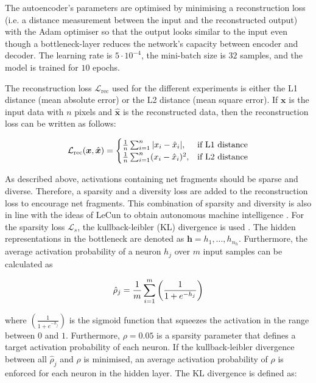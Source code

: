 The autoencoder's parameters are optimised by minimising a reconstruction loss (i.e. a distance measurement between the input and the reconstructed output) with the Adam optimiser  so that the output looks similar to the input even though a bottleneck-layer reduces the network's capacity between encoder and decoder.
The learning rate is $5 \cdot 10^{-4}$, the mini-batch size is $32$ samples, and the model is trained for $10$ epochs.

The reconstruction loss $\mathcal{L}_{\text{rec}}$ used for the different experiments is either the L1 distance (mean absolute error) or the L2 distance (mean square error). If $\boldsymbol{x}$ is the input data with $n$ pixels and $\hat{\boldsymbol{x}}$ is the reconstructed data, then the reconstruction loss can be written as follows:


\begin{align}\eqlbl{ae_recon}
		\mathcal{L}_{\text{rec}}(\boldsymbol{x}, \hat{\boldsymbol{x}}) = \begin{cases}
      		\frac{1}{n} \sum^{n}_{i=1}|x_i - \hat{x}_i|, & \text{if L1 distance}\\
      		\frac{1}{n} \sum^{n}_{i=1} (x_i - \hat{x}_i)^2, & \text{if L2 distance}
    	\end{cases}
\end{align}

As described above, activations containing net fragments should be sparse and diverse.
Therefore, a sparsity and a diversity loss are added to the reconstruction loss to encourage net fragments.
This combination of sparsity and diversity is also in line with the ideas of LeCun to obtain autonomous machine intelligence .
For the sparsity loss $\mathcal{L}_{s}$, the kullback-leibler (KL) divergence is used .
The hidden representations in the bottleneck are denoted as $\boldsymbol{h} = h_1, ..., h_{n_h}$.
Furthermore, the average activation probability of a neuron $h_j$ over $m$ input samples can be calculated as

\begin{align}\eqlbl{ae_kldd}
		\hat{\rho}_j = \frac{1}{m} \sum^m_{i=1} \left( \frac{1}{1+e^{-h_j}} \right)
\end{align}

where $\left( \frac{1}{1+e^{-h_j}} \right)$ is the sigmoid function that squeezes the activation in the range between $0$ and $1$. Furthermore, $\rho=0.05$ is a sparsity parameter that defines a target activation probability of each neuron. If the kullback-leibler divergence between all $\hat{\rho}_j$ and $\rho$ is minimised, an average activation probability of $\rho$ is enforced for each neuron in the hidden layer. The KL divergence is defined as:

